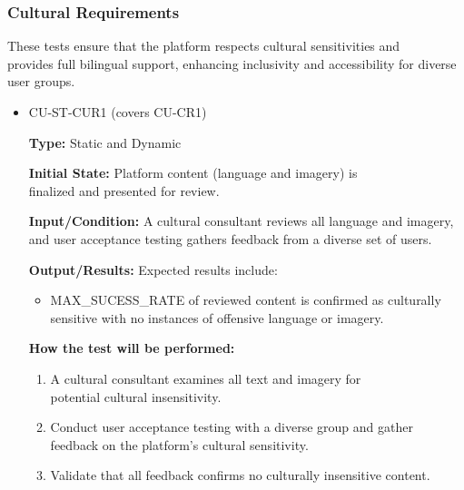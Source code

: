 \documentclass[12pt, titlepage]{article}
\begin{document}
\subsubsection{Cultural Requirements}

These tests ensure that the platform respects cultural sensitivities and \\provides full bilingual support, enhancing inclusivity and accessibility for diverse user groups.

\begin{itemize} 
  \item CU-ST-CUR1 (covers CU-CR1)
  \begin{mdframed}[linewidth=0.5mm] 
    \textbf{Type:} Static and Dynamic \par 
    \textbf{Initial State:} Platform content (language and imagery) is \\finalized and presented for review. \par 
    \textbf{Input/Condition:} A cultural consultant reviews all language and imagery, and user acceptance testing gathers feedback from a diverse set of users. \par 
    \textbf{Output/Results:} Expected results include: 
    \begin{itemize} 
      \item MAX\_SUCESS\_RATE of reviewed content is confirmed as culturally sensitive with no instances of offensive language or imagery. 
    \end{itemize} \par 
    \textbf{How the test will be performed:} 
    \begin{enumerate}[noitemsep] 
      \item A cultural consultant examines all text and imagery for \\potential cultural insensitivity. 
      \item Conduct user acceptance testing with a diverse group and gather feedback on the platform's cultural sensitivity. 
      \item Validate that all feedback confirms no culturally insensitive content. 
    \end{enumerate} 
  \end{mdframed}


\end{itemize}
\end{document}
